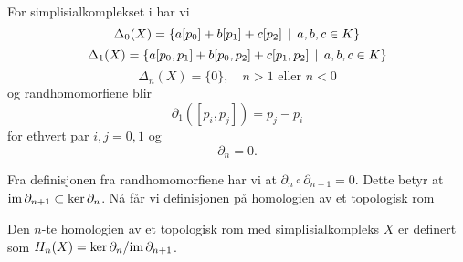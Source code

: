 \begin{eksempel}\label{eks:randhom}
  For simplisialkomplekset i  har vi
  \[\Delta_0(X) = \left\{a[p_0]+b[p_1]+c[p_2]\,\mid\,a,b,c\in K\right\}\]
  \[\Delta_1(X) = \left\{a[p_0,p_1]+b[p_0,p_2]+c[p_1,p_2]\,\mid\,a,b,c\in
  K\right\}\]
  \[\Delta_n(X) = \{0\},\quad n>1\text{ eller } n<0\]
  og randhomomorfiene blir
  \[\partial_1([p_i,p_j]) = p_j-p_i\]
  for ethvert par $i,j=0,1$ og
  \[\partial_n = 0.\]
\end{eksempel}

Fra definisjonen fra randhomomorfiene har vi at
$\partial_n\circ\partial_{n+1}=0$. Dette betyr at
$\textnormal{im}\,\partial_{n+1}\subset\ker\partial_n$. Nå får vi definisjonen
på homologien av et topologisk rom 

\begin{definisjon}\label{def:Homologi}
  Den $n$-te homologien av et topologisk rom med
  simplisialkompleks $X$ er definert
  som $H_n(X) = \ker\partial_n/\textnormal{im}\,\partial_{n+1}$.
\end{definisjon}






